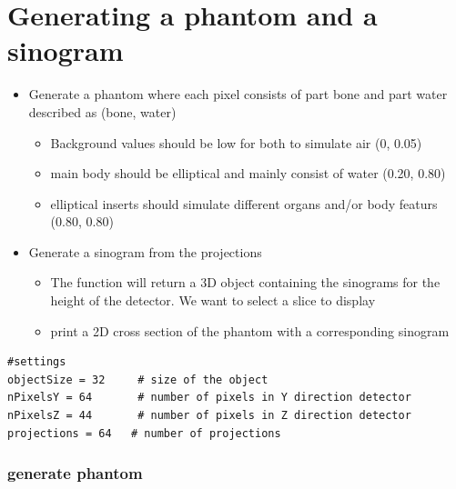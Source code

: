 \section{Generating a phantom and a sinogram}

\begin{itemize}
\item Generate a phantom where each pixel consists of part bone and part water described as (bone, water)

\begin{itemize}
\item Background values should be low for both to simulate air (0, 0.05)
\item main body should be elliptical and mainly consist of water (0.20, 0.80)
\item elliptical inserts should simulate different organs and/or body featurs (0.80, 0.80)
\end{itemize}


\item Generate a sinogram from the projections

\begin{itemize}
\item The function will return a 3D object containing the sinograms for the height of the detector. We want to select a slice to display
\item print a 2D cross section of the phantom with a corresponding sinogram
\end{itemize}
\end{itemize}

\begin{verbatim}
#settings
objectSize = 32     # size of the object
nPixelsY = 64       # number of pixels in Y direction detector
nPixelsZ = 44       # number of pixels in Z direction detector
projections = 64   # number of projections
\end{verbatim}

\subsubsection{generate phantom}

